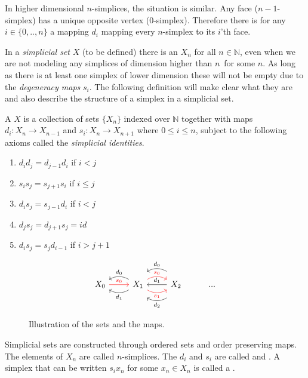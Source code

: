 \documentclass[../../main.tex]{subfiles}
\begin{document}
    In higher dimensional $n$-simplices, the situation is similar. Any face ($n-1$-simplex) has a unique opposite vertex ($0$-simplex). Therefore there is for any $i \in \{0,..,n\}$ a mapping $d_i$ mapping every $n$-simplex to its $i$'th face.

    In a \emph{simplicial set} $X$ (to be defined) there is an $X_n$ for all $n \in \mathbb{N}$, even when we are not modeling any simplices of dimension higher than $n$ for some $n$. As long as there is at least one simplex of lower dimension these will not be empty due to the \emph{degeneracy maps} $s_i$. The following definition will make clear what they are and also describe the structure of a simplex in a simplicial set.

    \begin{definition}\label{simplicial-set}
        A  $X$ is a collection of sets $\{X_n\}$ indexed over $\mathbb{N}$ together with maps $d_i: X_n \to X_{n-1}$ and $s_i: X_n\to X_{n+1}$ where $0 \leq i \leq n$, subject to the following axioms called the \emph{simplicial identities}.
        
        \begin{enumerate}
            \item $d_id_j = d_{j-1}d_i$ if $i < j$
            \item $s_is_j = s_{j+1}s_i$ if $i \leq j$
            \item $d_is_j = s_{j-1}d_i$ if $i < j$
            \item $d_js_j = d_{j+1}s_j = id$
            \item $d_is_j = s_jd_{i-1}$ if $i > j+1$
        \end{enumerate}
    \end{definition}

    \begin{figure}[H]
        \[
            \begin{tikzcd}
                X_0  \arrow[r,"s_0",red] & X_1 \arrow[l, "d_0",swap, bend right] \arrow[l,"d_1", bend left]  \arrow[r,"s_0",bend left,red] \arrow[r,"s_1",swap,bend right,red] & X_2 \arrow[l,"d_0",bend right,shift right=4,swap] \arrow[l,"d_1",swap] \arrow[l,"d_2",bend left,shift left=4] & ...
            \end{tikzcd}
        \]
        \caption{Illustration of the sets and the maps.}
    \end{figure}


    Simplicial sets are constructed through ordered sets and order preserving maps. The elements of $X_n$ are called $n$-simplices. The $d_i$ and $s_i$ are called  and . A simplex that can be written $s_ix_n$ for some $x_n \in X_n$ is called a . 
    
\end{document}
